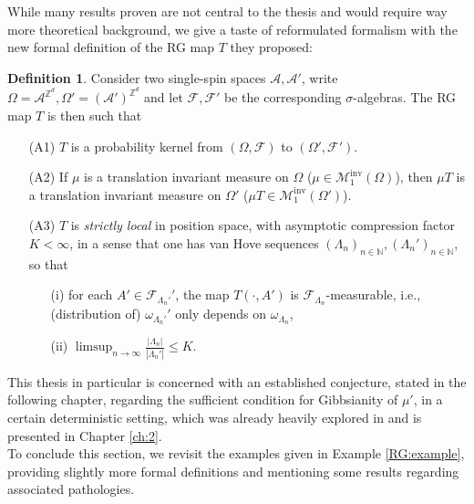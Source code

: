 \documentclass[12pt]{article}
\newcommand{\A}{\mathcal{A}}
\newcommand{\F}{\mathcal{F}}
\newcommand{\M}{\mathcal{M}}
\newcommand{\N}{\mathbb{N}}
\newcommand{\Z}{\mathbb{Z}}
\newcommand{\ra}{\rightarrow}
\newcommand{\pika}{\boldsymbol{\cdot}}
\newcommand{\1}{\mathbbm{1}}
\newcommand{\5}{\vspace{0.5cm}}
\theoremstyle{definition}
\newtheorem{df}[thm]{Definition}
\begin{document}
While many results proven are not central to the thesis and would require way more theoretical background, we give a taste of reformulated formalism with the new formal definition of the RG map $T$ they proposed:
\begin{df}
Consider two single-spin spaces $\A,\A'$, write $\Omega=\A^{\Z^d},\Omega'=(\A')^{\Z^{d}}$ and let $\F,\F'$ be the corresponding $\sigma$-algebras. The RG map $T$ is then such that 
\begin{itemize}
	\item[(A1)] $T$ is a probability kernel from $(\Omega,\F)$ to $(\Omega',\F')$.
	\item[(A2)] If $\mu$ is a translation invariant measure on $\Omega$ ($\mu\in\M_1^{\mathrm{inv}}(\Omega)$), then $\mu T$ is a translation invariant measure on $\Omega'$ ($\mu T\in\M_1^{\mathrm{inv}}(\Omega')$).
	\item[(A3)] $T$ is \textit{strictly local} in position space, with asymptotic compression factor $K<\infty$, in a sense that one has van Hove sequences $(\Lambda_n)_{n\in\N},(\Lambda_n')_{n\in\N}$, so that
	\begin{itemize}
		\item[(i)] for each $A'\in\F_{\Lambda_n'}'$, the map $T(\pika,A')$ is $\F_{\Lambda_n}$-measurable, i.e., (distribution of) $\omega_{\Lambda_n'}'$ only depends on $\omega_{\Lambda_n}$,
		\item[(ii)] $\limsup_{n\ra\infty}\frac{|\Lambda_n|}{|\Lambda_n'|}\leq K$.
	\end{itemize}
\end{itemize}
\end{df}

This thesis in particular is concerned with an established conjecture, stated in the following chapter, regarding the sufficient condition for Gibbsianity of $\mu'$, in a certain deterministic setting, which was already heavily explored in \cite{Ber} and is presented in Chapter \ref{ch:2}. \\

To conclude this section, we revisit the examples given in Example \ref{RG:example}, providing slightly more formal definitions and mentioning some results regarding associated pathologies.
\end{document}
